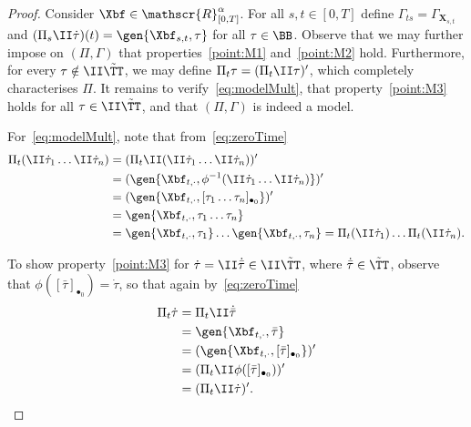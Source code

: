 \documentclass{article}
\begin{document}
\begin{proof}
Consider $\Xbf \in \mathscr{R}^\alpha_{[0,T]}$. For all $s,t \in [0,T]$ define $\Gamma_{ts} = \Gamma_{\mathbf{X}_{s,t}}$ and $(\Pi_s\II\dot\tau)(t) = \gen{\Xbf_{s,t},\tau}$ for all $\tau \in \BB$. Observe that we may further impose on $(\Pi,\Gamma)$ that properties~\ref{point:M1} and~\ref{point:M2} hold. Furthermore, for every $\tau \notin \II\tilde \TT$, we may define $\Pi_t \tau = (\Pi_t \II\tau)'$, which completely characterises $\Pi$. It remains to verify~\eqref{eq:modelMult}, that property~\ref{point:M3} holds for all $\tau \in \II\tilde \TT$, and that $(\Pi,\Gamma)$ is indeed a model.

For~\eqref{eq:modelMult}, note that from~\eqref{eq:zeroTime}
\begin{align*}
\Pi_t(\II \dot \tau_1\ldots \II \dot \tau_n) &= (\Pi_t \II(\II \dot \tau_1\ldots \II \dot\tau_n))' \\
&= (\gen{\Xbf_{t,\cdot}, \phi^{-1}(\II \dot \tau_1\ldots \II \dot\tau_n)})' \\
&= (\gen{\mathbf{\Xbf}_{t,\cdot},[\tau_1\ldots\tau_n]_{\bullet_0}})' \\
&= \gen{\mathbf{\Xbf}_{t,\cdot}, \tau_1\ldots\tau_n} \\
&= \gen{\mathbf{\Xbf}_{t,\cdot},\tau_1}\ldots\gen{\mathbf{\Xbf}_{t,\cdot},\tau_n} = \Pi_t(\II\dot\tau_1)\ldots \Pi_t(\II\dot\tau_n).
\end{align*}

To show property~\ref{point:M3} for $\dot \tau = \II\dot{\bar\tau} \in \II\tilde \TT$, where $\dot{\bar\tau} \in \tilde \TT$, observe that $\phi([\bar\tau]_{\bullet_0}) = \dot \tau$, so that again by~\eqref{eq:zeroTime}
\begin{align*}
\Pi_t \dot \tau &= \Pi_t \II \dot{\bar\tau} \\
&= \gen{\Xbf_{t,\cdot}, \bar\tau} \\
&= (\gen{\Xbf_{t,\cdot}, [\bar\tau]_{\bullet_0}})' \\
&= (\Pi_t \II\phi([\bar \tau]_{\bullet_0}))' \\
&= (\Pi_t \II\dot \tau)'.
\end{align*}


\end{proof}
\end{document}
